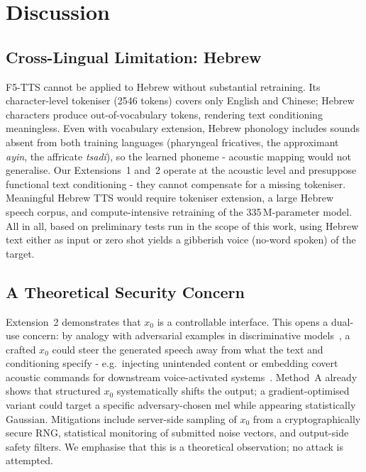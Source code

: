 \documentclass[11pt,a4paper,twocolumn]{article}
\begin{document}
\section{Discussion}
\label{sec:discussion}

\subsection{Cross-Lingual Limitation: Hebrew}%
\label{sec:hebrew}

F5-TTS cannot be applied to Hebrew without substantial retraining.
Its character-level tokeniser (2546 tokens) covers only English and Chinese;
Hebrew characters produce out-of-vocabulary tokens, rendering text
conditioning meaningless.  Even with vocabulary extension, Hebrew phonology
includes sounds absent from both training languages (pharyngeal fricatives,
the approximant \textit{ayin}, the affricate \textit{tsadi}), so the
learned phoneme - acoustic mapping would not generalise.  Our Extensions~1
and~2 operate at the acoustic level and presuppose functional text
conditioning - they cannot compensate for a missing tokeniser.  Meaningful
Hebrew TTS would require tokeniser extension, a large Hebrew speech corpus,
and compute-intensive retraining of the 335\,M-parameter model. All in all,
based on preliminary tests run in the scope of this work, using Hebrew text 
either as input or zero shot yields a gibberish voice (no-word spoken) of the target.

\subsection{A Theoretical Security Concern}%
\label{sec:security}

Extension~2 demonstrates that $x_0$ is a controllable interface.  This
opens a dual-use concern: by analogy with adversarial examples in
discriminative models~\cite{szegedy2014intriguing,goodfellow2015fgsm},
a crafted $x_0$ could steer the generated speech away from what the text
and conditioning specify - e.g.\ injecting unintended content or embedding
covert acoustic commands for downstream voice-activated
systems~\cite{carlini2018audio}.  Method~A already shows that structured
$x_0$ systematically shifts the output; a gradient-optimised variant could
target a specific adversary-chosen mel while appearing statistically
Gaussian.  Mitigations include server-side sampling of $x_0$ from a
cryptographically secure RNG, statistical monitoring of submitted noise
vectors, and output-side safety filters.  We emphasise that this is a
theoretical observation; no attack is attempted.
\end{document}

